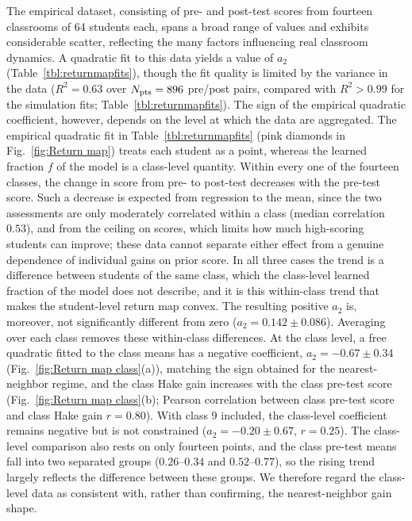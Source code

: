 \documentclass[a4paper,fleqn]{cas-sc}
\begin{document}
    The empirical dataset, consisting of pre- and post-test scores from fourteen classrooms of 64 students each, spans a broad range of values and exhibits considerable scatter, reflecting the many factors influencing real classroom dynamics.
    A quadratic fit to this data yields a value of $a_2$ (Table~\ref{tbl:returnmapfits}), though the fit quality is limited by the variance in the data ($R^2=0.63$ over $N_{\rm pts}=896$ pre/post pairs, compared with $R^2>0.99$ for the simulation fits; Table~\ref{tbl:returnmapfits}).
    The sign of the empirical quadratic coefficient, however, depends on the level at which the data are aggregated.
    The empirical quadratic fit in Table~\ref{tbl:returnmapfits} (pink diamonds in Fig.~\ref{fig:Return map}) treats each student as a point, whereas the learned fraction $f$ of the model is a class-level quantity.
    Within every one of the fourteen classes, the change in score from pre- to post-test decreases with the pre-test score.
    Such a decrease is expected from regression to the mean, since the two assessments are only moderately correlated within a class (median correlation $0.53$), and from the ceiling on scores, which limits how much high-scoring students can improve; these data cannot separate either effect from a genuine dependence of individual gains on prior score.
    In all three cases the trend is a difference between students of the same class, which the class-level learned fraction of the model does not describe, and it is this within-class trend that makes the student-level return map convex.
    The resulting positive $a_2$ is, moreover, not significantly different from zero ($a_2=0.142\pm0.086$).
    Averaging over each class removes these within-class differences.
    At the class level, a free quadratic fitted to the class means has a negative coefficient, $a_2=-0.67\pm0.34$ (Fig.~\ref{fig:Return map class}(a)), matching the sign obtained for the nearest-neighbor regime, and the class Hake gain increases with the class pre-test score (Fig.~\ref{fig:Return map class}(b); Pearson correlation between class pre-test score and class Hake gain $r=0.80$).
    With class 9 included, the class-level coefficient remains negative but is not constrained ($a_2=-0.20\pm0.67$, $r=0.25$).
    The class-level comparison also rests on only fourteen points, and the class pre-test means fall into two separated groups ($0.26$--$0.34$ and $0.52$--$0.77$), so the rising trend largely reflects the difference between these groups.
    We therefore regard the class-level data as consistent with, rather than confirming, the nearest-neighbor gain shape.
\end{document}
